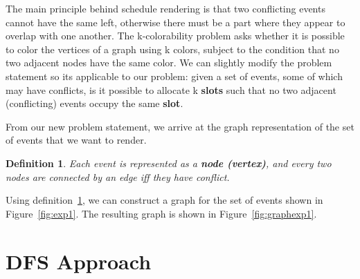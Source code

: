 \documentclass[12pt]{article}
\newtheorem{definition}{Definition}
\begin{document}
The main principle behind schedule rendering is that two conflicting events cannot have the same left, otherwise there must be a part where they appear to overlap with one another.
The k-colorability problem asks whether it is possible to color the vertices of a graph using k colors, subject to the condition that no two adjacent nodes have the same color. We can slightly modify the problem statement so its applicable to our problem: given a set of events, some of which may have conflicts, is it possible to allocate k \textbf{slots} such that no two adjacent (conflicting) events occupy the same \textbf{slot}.

From our new problem statement, we arrive at the graph representation of the set of events that we want to render.

\begin{definition}\label{def:3}
    Each event is represented as a \textbf{node (vertex)}, and every two nodes are connected by an edge iff they have conflict.
\end{definition}

Using definition~\ref{def:3}, we can construct a graph for the set of events shown in Figure~\ref{fig:exp1}. The resulting graph is shown in Figure~\ref{fig:graphexp1}.

\section{DFS Approach}
\end{document}
